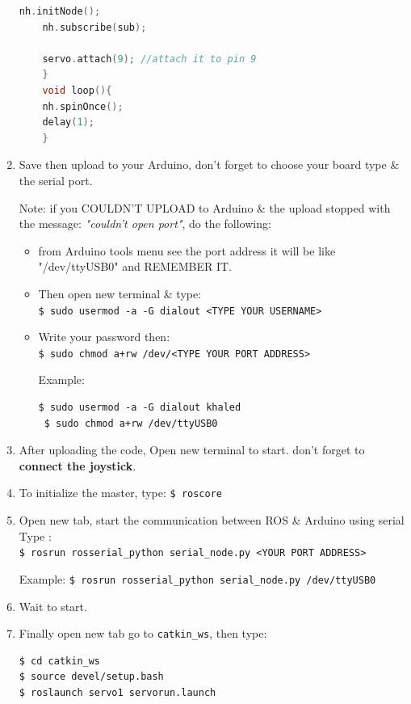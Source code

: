 \begin{enumerate}
\begin{lstlisting}[language=C++]
 	nh.initNode();
 	nh.subscribe(sub);
 	
 	servo.attach(9); //attach it to pin 9
 	}
 	void loop(){
 	nh.spinOnce();
 	delay(1);
 	}
 	\end{lstlisting}
 	\item Save then upload to your Arduino, don't forget to choose your board type \& the serial port.
 	
 	Note: if you COULDN'T UPLOAD to Arduino \& the upload stopped with the message: \emph{"couldn't open port"}, do the following:
     \begin{itemize}
         \item from Arduino tools menu see the port address it will be like "/dev/ttyUSB0" and REMEMBER IT.
         \item Then open new terminal \& type: \\
         \lstinline|$ sudo usermod -a -G dialout <TYPE YOUR USERNAME>|
         
         \item Write your password then:\\
         \lstinline|$ sudo chmod a+rw /dev/<TYPE YOUR PORT ADDRESS>|
         
         Example:
         \begin{lstlisting}[language=terCmd]
 $ sudo usermod -a -G dialout khaled
 $ sudo chmod a+rw /dev/ttyUSB0
         \end{lstlisting}
     \end{itemize}

     \item After uploading the code, Open new terminal to start. don't forget to \textbf{connect the joystick}.
 	
     \item To initialize the master, type: \lstinline|$ roscore|
 	\item Open new tab, start the communication between ROS \& Arduino using serial Type :\\
 	\lstinline|$ rosrun rosserial_python serial_node.py <YOUR PORT ADDRESS>| 

     Example: \lstinline|$ rosrun rosserial_python serial_node.py /dev/ttyUSB0|

    \item Wait to start.
     
 	\item Finally open new tab go to \verb|catkin_ws|, then type:
     \begin{lstlisting}[language=terCmd]
$ cd catkin_ws
$ source devel/setup.bash
$ roslaunch servo1 servorun.launch
     \end{lstlisting}
 \end{enumerate}


